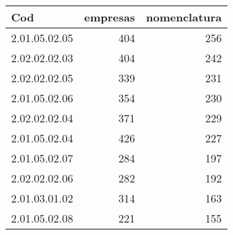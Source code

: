 \begin{table}[ht]
\centering
\begin{tabular}{lrr}
  \hline
Cod & empresas & nomenclatura \\ 
  \hline
2.01.05.02.05 & 404 & 256 \\ 
  2.02.02.02.03 & 404 & 242 \\ 
  2.02.02.02.05 & 339 & 231 \\ 
  2.01.05.02.06 & 354 & 230 \\ 
  2.02.02.02.04 & 371 & 229 \\ 
  2.01.05.02.04 & 426 & 227 \\ 
  2.01.05.02.07 & 284 & 197 \\ 
  2.02.02.02.06 & 282 & 192 \\ 
  2.01.03.01.02 & 314 & 163 \\ 
  2.01.05.02.08 & 221 & 155 \\ 
   \hline
\end{tabular}
\end{table}
